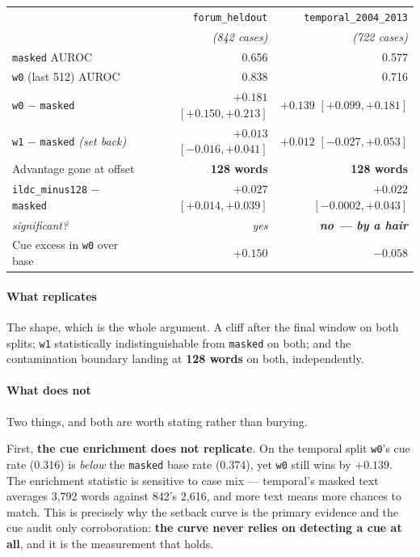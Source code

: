 \documentclass[12pt,a4paper]{article}
\newcommand{\code}[1]{\texttt{\small #1}}
\begin{document}
\begin{center}
\begin{tabular}{@{}lrr@{}}
\toprule
 & \code{forum\_heldout} & \code{temporal\_2004\_2013} \\
 & \emph{(842 cases)} & \emph{(722 cases)} \\
\midrule
\code{masked} AUROC & 0.656 & 0.577 \\
\code{w0} (last 512) AUROC & 0.838 & 0.716 \\
\midrule
\code{w0} $-$ \code{masked} & $+0.181$ $[+0.150, +0.213]$ & $+0.139$ $[+0.099, +0.181]$ \\
\code{w1} $-$ \code{masked} \emph{(set back)} & $+0.013$ $[-0.016, +0.041]$ & $+0.012$ $[-0.027, +0.053]$ \\
Advantage gone at offset & \textbf{128 words} & \textbf{128 words} \\
\midrule
\code{ildc\_minus128} $-$ \code{masked} & $+0.027$ $[+0.014, +0.039]$ & $+0.022$ $[-0.0002, +0.043]$ \\
\emph{\quad significant?} & \emph{yes} & \textbf{\emph{no --- by a hair}} \\
\midrule
Cue excess in \code{w0} over base & $+0.150$ & $\mathbf{-0.058}$ \\
\bottomrule
\end{tabular}
\end{center}

\paragraph{What replicates} The shape, which is the whole argument. A cliff after the final window on
both splits; \code{w1} statistically indistinguishable from \code{masked} on both; and the
contamination boundary landing at \textbf{128 words} on both, independently.

\paragraph{What does not} Two things, and both are worth stating rather than burying.

First, \textbf{the cue enrichment does not replicate}. On the temporal split \code{w0}'s cue rate
(0.316) is \emph{below} the \code{masked} base rate (0.374), yet \code{w0} still wins by $+0.139$.
The enrichment statistic is sensitive to case mix --- temporal's masked text averages 3,792 words
against 842's 2,616, and more text means more chances to match. This is precisely why the setback
curve is the primary evidence and the cue audit only corroboration: \textbf{the curve never relies
on detecting a cue at all}, and it is the measurement that holds.
\end{document}
